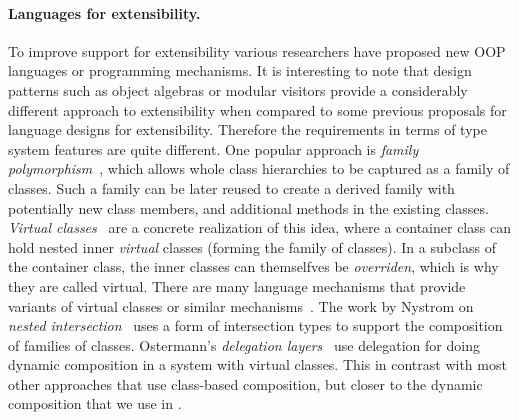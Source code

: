 \paragraph{Languages for extensibility.}
To improve support for extensibility various researchers have proposed
new OOP languages or programming mechanisms. It is interesting to
note that design patterns such as object algebras or modular visitors
provide a considerably different approach to extensibility when
compared to some previous proposals for language designs for
extensibility. Therefore the requirements in terms of type system
features are quite different.  One popular approach is \emph{family
  polymorphism}~\cite{Ernst01family}, which allows whole class hierarchies to be
captured as a family of classes. Such a family can be later reused to
create a derived family with potentially new class members, and
additional methods in the existing classes.  \emph{Virtual
  classes}~\cite{ernst2006virtual} are a concrete realization of this idea, where a
container class can hold nested inner \emph{virtual} classes (forming
the family of classes). In a subclass of the container class, the
inner classes can themselfves be \emph{overriden}, which is why they
are called virtual. There are many language mechanisms that provide
variants of virtual classes or similar mechanisms~\cite{McDirmid01Jiazzi,Aracic06CaesarJ,Smaragdakis98mixin,nystrom2006j}. The work by 
Nystrom on \emph{nested intersection}~\cite{nystrom2006j} uses a
form of intersection types to support the composition of
families of classes. Ostermann's \emph{delegation layers}~\cite{Ostermann02dynamically}
use delegation for doing dynamic composition in a system 
with virtual classes. This in contrast with most other approaches 
that use class-based composition, but closer to the dynamic
composition that we use in \name.
\begin{comment}
In contrast to type systems for virtual classes 
and similar mechanisms, the goal of our work is to study the type
systems and basic language mechanism to better support such design patterns. 
 some researchers have designed new type
system features such as virtual classes~\cite{ernst2006virtual}, polymorphic
variants~\cite{garrigue1998programming}, while others have shown employing
programming pattern such as object algebras~\cite{oliveira2012extensibility} by
using features within existing programming languages. Both of the two approaches
have drawbacks of some kind. The first approach often involves heavyweight
designs, while the second approach still sacrifices the readability for
extensibility.
\bruno{fill me in with more details and more references!}
\end{comment}

